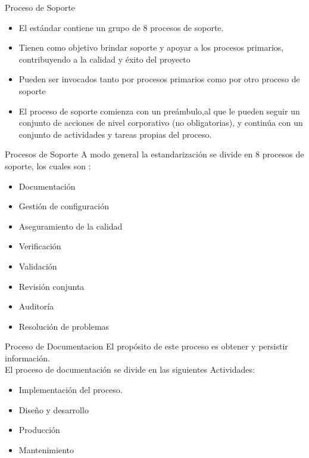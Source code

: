 \documentclass{beamer}
\begin{document}
			\begin{frame}{Proceso de Soporte}
				\begin{itemize}
					\item El estándar contiene un grupo de 8 procesos de soporte.\pause
					\item Tienen como objetivo brindar soporte y apoyar a los procesos primarios, contribuyendo a la calidad y éxito del proyecto\pause
					\item Pueden ser invocados tanto por procesos primarios como por otro proceso de soporte\pause
					\item El proceso de soporte comienza con un preámbulo,al que le pueden seguir un conjunto de acciones de nivel corporativo (no obligatorias), y continúa con un conjunto de actividades y tareas propias del proceso.
				\end{itemize}
			\end{frame}
			
			\begin{frame}{Procesos de Soporte}
			A modo general la estandarización se divide en 8 procesos de soporte, los cuales son :\pause
				\begin{itemize}
					\item Documentación
					\item Gestión de configuración
					\item Aseguramiento de la calidad
					\item Verificación
					\item Validación
					\item Revisión conjunta
					\item Auditoría
					\item Resolución de problemas
				\end{itemize}
			\end{frame}
			
			\begin{frame}{Proceso de Documentacion}
				El propósito de este proceso es obtener y persistir información.\\
				
				El proceso de documentación se divide en las siguientes Actividades:\pause
					\begin{itemize}
						\item Implementación del proceso.\pause
						\item Diseño y desarrollo\pause
						\item Producción\pause
						\item Mantenimiento
					\end{itemize}
			\end{frame}
			
\end{document}
